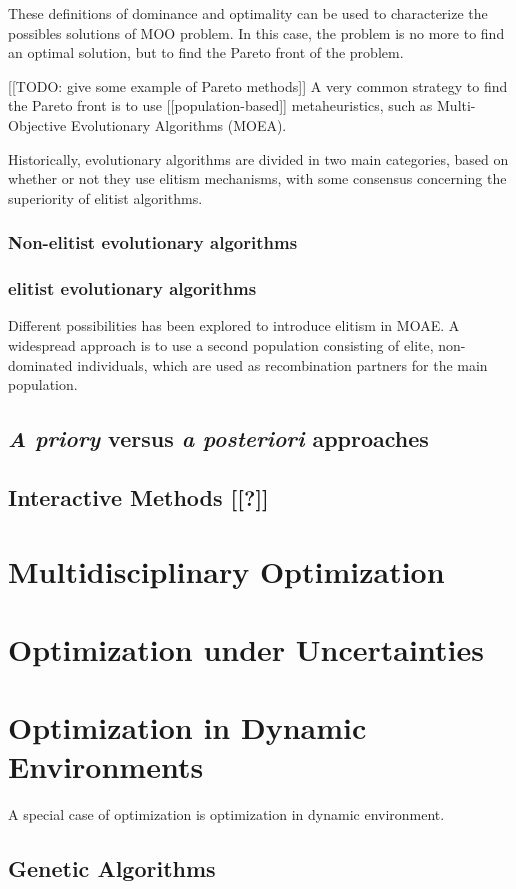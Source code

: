 These definitions of dominance and optimality can be used to characterize the possibles solutions of MOO problem. In this case, the problem is no more to find an optimal solution, but to find the Pareto front of the problem.

[[TODO: give some example of Pareto methods]]
A very common strategy to find the Pareto front is to use [[population-based]] metaheuristics, such as Multi-Objective Evolutionary Algorithms (MOEA). 

Historically, evolutionary algorithms are divided in two main categories, based on whether or not they use elitism mechanisms, with some consensus concerning the superiority of elitist algorithms.

\subsubsection{Non-elitist evolutionary algorithms}

\subsubsection{elitist evolutionary algorithms}

Different possibilities has been explored to introduce elitism in MOAE. A widespread approach is to use a second population consisting of elite, non-dominated individuals, which are used as recombination partners for the main population.

\subsection{\emph{A priory} versus \emph{a posteriori} approaches}



\subsection{Interactive Methods [[?]]}

\section{Multidisciplinary Optimization}

\section{Optimization under Uncertainties}

\section{Optimization in Dynamic Environments}
A special case of optimization is optimization in dynamic environment.

\subsection{Genetic Algorithms}



